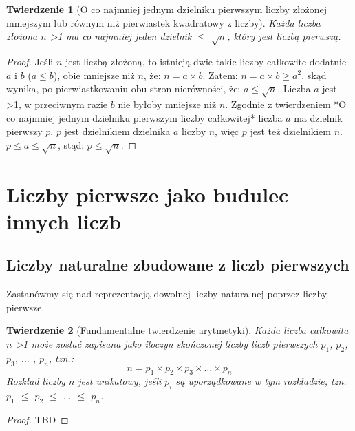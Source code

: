\documentclass[10pt,onecolumn]{article}
\newtheorem{theorem}{Twierdzenie}
\theoremstyle{definition}
\theoremstyle{hypothesis}
\theoremstyle{capability}
\begin{document}
\begin{theorem} [O co najmniej jednym dzielniku pierwszym liczby złożonej mniejszym lub równym niż pierwiastek kwadratowy z liczby]
Każda liczba złożona $n$ \textgreater 1 ma co najmniej jeden dzielnik $\le$ $\sqrt{n}$, który jest liczbą pierwszą. 
\end{theorem}
 
\begin{proof}
Jeśli $n$ jest liczbą złożoną, to istnieją dwie takie liczby całkowite dodatnie $a$ i $b$ ($a \leq b$), obie mniejsze niż $n$, że: $n = a \times b$. Zatem: $n = a \times b \geq a^2$, skąd wynika, po pierwiastkowaniu obu stron nierówności, że: $a \leq \sqrt{n}$. Liczba $a$ jest \textgreater 1, w przeciwnym razie $b$ nie byłoby mniejsze niż $n$. Zgodnie z twierdzeniem *O co najmniej jednym dzielniku pierwszym liczby całkowitej* liczba $a$ ma dzielnik pierwszy $p$. $p$ jest dzielnikiem dzielnika $a$ liczby $n$, więc $p$ jest też dzielnikiem $n$. $p \leq a \leq \sqrt{n}$, stąd: $p \leq \sqrt{n}$.
\end{proof}

\newpage


\section{Liczby pierwsze jako budulec innych liczb}

\subsection{Liczby naturalne zbudowane z liczb pierwszych}

Zastanówmy się nad reprezentacją dowolnej liczby naturalnej poprzez liczby pierwsze.

\begin{theorem}[Fundamentalne twierdzenie arytmetyki]
Każda liczba całkowita $n$ \textgreater 1 może zostać zapisana jako iloczyn skończonej liczby liczb pierwszych $p_1$, $p_2$, $p_3$, $\ldots$ , $p_n$, tzn.: $$ n = p_1 \times p_2 \times p_3 \times \ldots \times p_n$$  Rozkład liczby $n$ jest unikatowy, jeśli $p_i$ są uporządkowane w tym rozkładzie, tzn. $p_1$ $\leq$ $p_2$ $\leq$ $\ldots$ $\leq$ $p_n$.
\end{theorem}
 
\begin{proof}
TBD
\end{proof}
\end{document}
